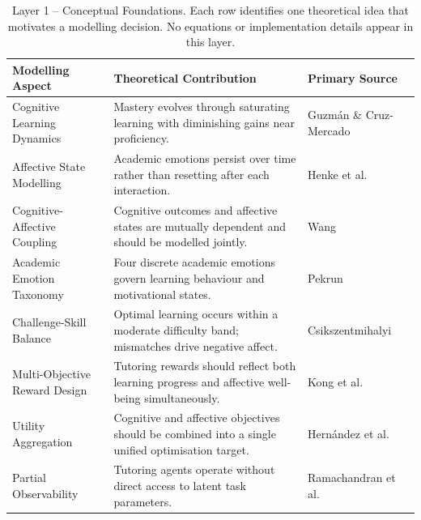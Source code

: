 \renewcommand{\arraystretch}{1.5}
\begin{table}[H]
\centering
\caption{Layer 1 -- Conceptual Foundations. Each row identifies one theoretical idea that motivates a modelling decision. No equations or implementation details appear in this layer.}
\label{tab:rl_foundations}
\begin{tabular}{>{\raggedright\arraybackslash}p{5.0cm}>{\raggedright\arraybackslash}p{5.8cm}>{\raggedright\arraybackslash}p{2.8cm}}
\toprule
\textbf{Modelling Aspect} & \textbf{Theoretical Contribution} & \textbf{Primary Source} \\
\midrule
Cognitive Learning Dynamics
    & Mastery evolves through saturating learning with diminishing gains near proficiency.
    & Guzm{\'a}n \& Cruz-Mercado~\cite{guzman_developing_2025} \\
Affective State Modelling
    & Academic emotions persist over time rather than resetting after each interaction.
    & Henke et al.~\cite{henke_dsem_2026} \\
Cognitive-Affective Coupling
    & Cognitive outcomes and affective states are mutually dependent and should be modelled jointly.
    & Wang~\cite{wang_factored_pomdp_2018} \\
Academic Emotion Taxonomy
    & Four discrete academic emotions govern learning behaviour and motivational states.
    & Pekrun~\cite{pekrun_control-value_2006} \\
Challenge-Skill Balance
    & Optimal learning occurs within a moderate difficulty band; mismatches drive negative affect.
    & Csikszentmihalyi~\cite{csikszentmihalyi_flow_1990} \\
Multi-Objective Reward Design
    & Tutoring rewards should reflect both learning progress and affective well-being simultaneously.
    & Kong et al.~\cite{kong_real-time_2025} \\
Utility Aggregation
    & Cognitive and affective objectives should be combined into a single unified optimisation target.
    & Hern{\'a}ndez et al.~\cite{hernandez_affective_2015} \\
Partial Observability
    & Tutoring agents operate without direct access to latent task parameters.
    & Ramachandran et al.~\cite{ramachandran_pomdp_2018} \\
\bottomrule
\end{tabular}
\end{table}

